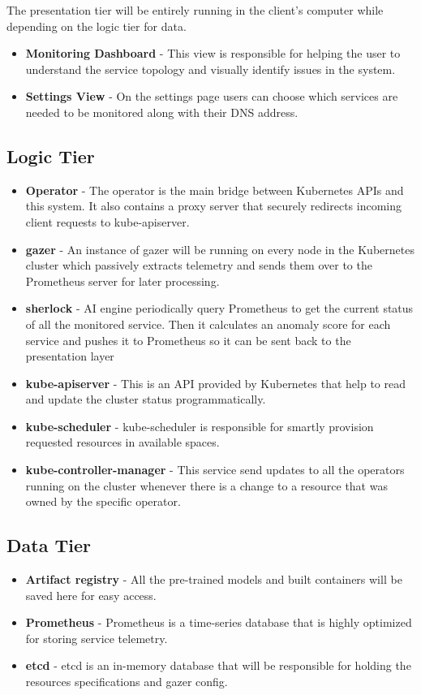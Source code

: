 The presentation tier will be entirely running in the client's computer while depending on the logic tier for data.

\begin{itemize}
    \item \textbf{Monitoring Dashboard} - This view is responsible for helping the user to understand the service topology and visually identify issues in the system.
    \item \textbf{Settings View} - On the settings page users can choose which services are needed to be monitored along with their DNS address.
\end{itemize}

\subsection{Logic Tier}

\begin{itemize}
    \item \textbf{Operator} - The operator is the main bridge between Kubernetes APIs and this system. It also contains a proxy server that securely redirects incoming client requests to kube-apiserver.
    \item \textbf{\ac{gazer}} - An instance of \ac{gazer} will be running on every node in the Kubernetes cluster which passively extracts telemetry and sends them over to the Prometheus server for later processing.
    \item \textbf{\ac{sherlock}} - AI engine periodically query Prometheus to get the current status of all the monitored service. Then it calculates an anomaly score for each service and pushes it to Prometheus so it can be sent back to the presentation layer
    \item \textbf{kube-apiserver} - This is an API provided by Kubernetes that help to read and update the cluster status programmatically.
    \item \textbf{kube-scheduler} - kube-scheduler is responsible for smartly provision requested resources in available spaces.
    \item \textbf{kube-controller-manager} - This service send updates to all the operators running on the cluster whenever there is a change to a resource that was owned by the specific operator.
\end{itemize}

\subsection{Data Tier}

\begin{itemize}
    \item \textbf{Artifact registry} - All the pre-trained models and built containers will be saved here for easy access.
    \item \textbf{Prometheus} - Prometheus is a time-series database that is highly optimized for storing service telemetry.
    \item \textbf{etcd} - etcd is an in-memory database that will be responsible for holding the resources specifications and \ac{gazer} config.
\end{itemize}